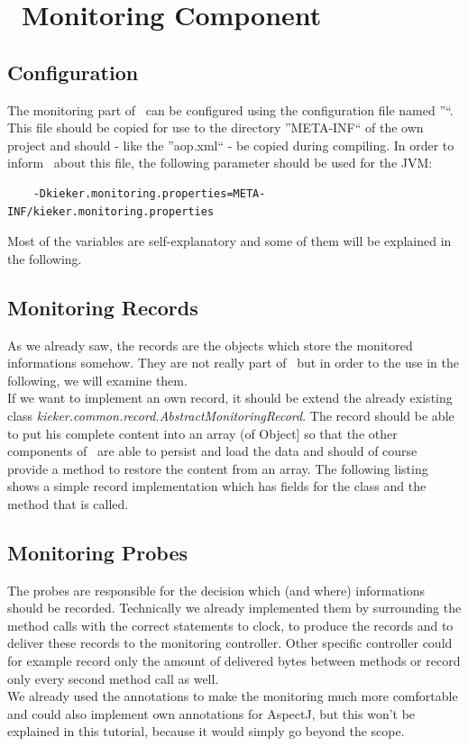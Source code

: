   \chapter{\Kieker\ Monitoring Component}
    \section{Configuration}
      The monitoring part of \Kieker\ can be configured using the configuration file named ''\monitoringPropertiesFile``. This file should be copied for use to the directory ''META-INF`` of the own project and should - like the ''aop.xml`` - be copied during compiling. In order to inform \Kieker\ about this file, the following parameter should be used for the JVM:
      \begin{lstlisting}
	-Dkieker.monitoring.properties=META-INF/kieker.monitoring.properties
      \end{lstlisting}
      Most of the variables are self-explanatory and some of them will be explained in the following.

    \section{Monitoring Records}
      As we already saw, the records are the objects which store the monitored informations somehow. They are not really part of \KiekerMonitoring\ but in order to the use in the following, we will examine them.\\
      If we want to implement an own record, it should be extend the already existing class \textit{kieker.common.record.AbstractMonitoringRecord}. The record should be able to put his complete content into an array (of Object] so that the other components of \Kieker\ are able to persist and load the data and should of course provide a method to restore the content from an array. The following listing shows a simple record implementation which has fields for the class and the method that is called.
      \setJavaCodeListing
      \lstset{caption=MyRecord.java}
      

    \section{Monitoring Probes}
      The probes are responsible for the decision which (and where) informations should be recorded. Technically we already implemented them by surrounding the method calls with the correct statements to clock, to produce the records and to deliver these records to the monitoring controller. Other specific controller could for example record only the amount of delivered bytes between methods or record only every second method call as well.\\
      We already used the annotations to make the monitoring much more comfortable and could also implement own annotations for AspectJ, but this won't be explained in this tutorial, because it would simply go beyond the scope.

